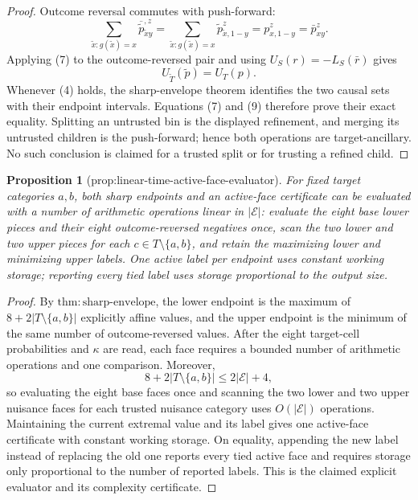 \documentclass{article}
\newtheorem{proposition}{Proposition}
\begin{document}
\begin{proof}
Outcome reversal commutes with push-forward:
\[
 \sum_{\widetilde x:g(\widetilde x)=x}
 \overline{\widetilde p}^{,z}_{\widetilde x y}
 =\sum_{\widetilde x:g(\widetilde x)=x}
 \widetilde p^z_{\widetilde x,1-y}
 =p^z_{x,1-y}=\bar p^z_{xy}. \tag{8}
\]
Applying (7) to the outcome-reversed pair and using
\(U_S(r)=-L_S(\bar r)\) gives
\[
 U_{\widetilde T}(\widetilde p)=U_T(p). \tag{9}
\]
Whenever (4) holds, the sharp-envelope theorem identifies the two causal
sets with their endpoint intervals.  Equations (7) and (9) therefore prove
their exact equality.  Splitting an untrusted bin is the displayed
refinement, and merging its untrusted children is the push-forward; hence
both operations are target-ancillary.  No such conclusion is claimed for a
trusted split or for trusting a refined child.
\end{proof}

\begin{proposition}[prop:linear-time-active-face-evaluator]\label{prop:linear-time-active-face-evaluator}
For fixed target categories \(a,b\), both sharp endpoints and an active-face certificate can be evaluated with a number of arithmetic operations linear in \(|\mathcal E|\): evaluate the eight base lower pieces and their eight outcome-reversed negatives once, scan the two lower and two upper pieces for each \(c\in T\setminus\{a,b\}\), and retain the maximizing lower and minimizing upper labels.  One active label per endpoint uses constant working storage; reporting every tied label uses storage proportional to the output size.
\end{proposition}
\begin{proof}
By \(\mathrm{thm{:}sharp\mbox{-}envelope}\), the lower endpoint is the
maximum of \(8+2|T\setminus\{a,b\}|\) explicitly affine values, and the
upper endpoint is the minimum of the same number of outcome-reversed
values.  After the eight target-cell probabilities and \(\kappa\) are
read, each face requires a bounded number of arithmetic operations and one
comparison.  Moreover,
\[
 8+2|T\setminus\{a,b\}|\le 2|\mathcal E|+4,
\]
so evaluating the eight base faces once and scanning the two lower and two
upper nuisance faces for each trusted nuisance category uses
\(O(|\mathcal E|)\) operations.  Maintaining the current extremal value and
its label gives one active-face certificate with constant working storage.
On equality, appending the new label instead of replacing the old one
reports every tied active face and requires storage only proportional to
the number of reported labels.  This is the claimed explicit evaluator and
its complexity certificate.
\end{proof}
\end{document}
